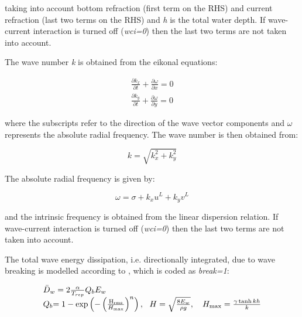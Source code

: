 taking into account bottom refraction (first term on the RHS) and current refraction (last two terms on the RHS) and \textit{h} is the total water depth. If wave-current interaction is turned off (\textit{wci=0}) then the last two terms are not taken into account.

The wave number \textit{k} is obtained from the eikonal equations:

\begin{equation} \label{2.5)} 
\begin{array}{l} {\frac{\partial k_{x} }{\partial t} +\frac{\partial \omega }{\partial x} =0} \\ {\frac{\partial k_{y} }{\partial t} +\frac{\partial \omega }{\partial y} =0} \end{array} 
\end{equation} 

where the subscripts refer to the direction of the wave vector components and $\omega $ represents the absolute radial frequency. The wave number is then obtained from:

\begin{equation} \label{2.6)} 
k=\sqrt{k_{x}^{2} +k_{y}^{2} }  
\end{equation} 

The absolute radial frequency is given by:

\begin{equation} \label{2.7)} 
\omega =\sigma +k_{x} u^{L} +k_{y} v^{L}  
\end{equation} 

and the intrinsic frequency is obtained from the linear dispersion relation. If wave-current interaction is turned off (\textit{wci=0}) then the last two terms are not taken into account.

The total wave energy dissipation, i.e. directionally integrated, due to wave breaking is modelled according to \citet{Roelvink1993a}, which is coded as \textit{break=1}:

\begin{equation} \label{2.8)} 
\begin{array}{l} {\bar{D}_{w} =2\frac{\alpha }{T_{rep} } Q_{b} E_{w} } \\ {Q_{b} {\rm =1-exp}\left({\rm -}\left(\frac{{\rm H}_{{\rm rms}} }{H_{\max } } \right)^{n} \right),\, \, \, \, H=\sqrt{\frac{8E_{w} }{\rho g} } ,\quad H_{\max } =\frac{\gamma \tanh kh}{k} } \end{array} 
\end{equation} 

